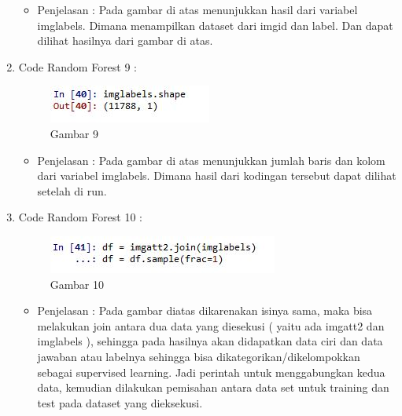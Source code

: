\begin{enumerate}
\begin{itemize}
\item Penjelasan : Pada gambar di atas menunjukkan hasil dari variabel imglabels. Dimana menampilkan dataset dari imgid dan label. Dan dapat dilihat hasilnya dari gambar di atas.
\par
\par
\end{itemize}
\item Code Random Forest 9 :
\par
\begin{figure}[ht]
\centering
\includegraphics[scale=0.7]{figures/AFS/4i.jpg}
\caption{Gambar 9}
\label{contoh}
\end{figure}
\par
\begin{itemize}
\item Penjelasan : Pada gambar di atas menunjukkan jumlah baris dan kolom dari variabel imglabels. Dimana hasil dari kodingan tersebut dapat dilihat setelah di run. 
\par
\par
\end{itemize}
\item Code Random Forest 10 :
\par
\begin{figure}[ht]
\centering
\includegraphics[scale=0.7]{figures/AFS/4j.jpg}
\caption{Gambar 10}
\label{contoh}
\end{figure}
\par
\begin{itemize}
\item Penjelasan : Pada gambar diatas dikarenakan isinya sama, maka bisa melakukan join antara dua data yang diesekusi ( yaitu ada imgatt2 dan imglabels ), sehingga pada hasilnya akan didapatkan data ciri dan data jawaban atau labelnya sehingga bisa dikategorikan/dikelompokkan sebagai supervised learning. Jadi perintah untuk menggabungkan kedua data, kemudian dilakukan pemisahan antara data set untuk training dan test pada dataset yang dieksekusi.
\par
\par
\end{itemize}

\end{enumerate}
